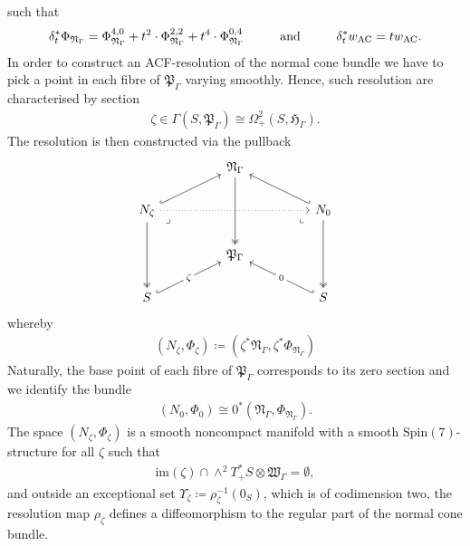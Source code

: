 \documentclass[psamsfonts]{amsart}
\theoremstyle{plain}
\theoremstyle{definition}{
\newtheorem{defi}{Definition}[section]
\newtheorem{ass}{Assumption}
\newtheorem*{nota}{Notation}}
\theoremstyle{remark}{
\newtheorem{rem}{Remark}
\newtheorem{ex}{Example}}
\theoremstyle{plain}{
\newtheorem{thm}{Theorem}[section]
\newtheorem{lem}{Lemma}[section]
\newtheorem{cor}{Corollary}[section]
\newtheorem{prop}{Proposition}[section]
\newtheorem{con}{Conjecture}[section]}
\newcommand{\m}[1]{{\mathrm{#1}}}
\newcommand{\und}[1]{\hspace{#1}\text{and}\hspace{#1}}
\begin{document}
   such that 
   \begin{align*}
       \delta_t^*\Phi_{\mathfrak{N}_\Gamma}=\Phi_{\mathfrak{N}_\Gamma}^{4,0}+t^2\cdot\Phi_{\mathfrak{N}_\Gamma}^{2,2}+t^4\cdot\Phi_{\mathfrak{N}_\Gamma}^{0,4}\und{1.0cm}\delta_t^*w_{\m{AC}}=tw_{\m{AC}}.
   \end{align*}
In order to construct an ACF-resolution of the normal cone bundle we have to pick a point in each fibre of $\mathfrak{P}_\Gamma$ varying smoothly. Hence, such resolution are characterised by section 
\begin{align*}
    \zeta\in \Gamma(S,\mathfrak{P}_\Gamma)\cong \Omega^2_+(S,\mathfrak{H}_\Gamma).
\end{align*}
The resolution is then constructed via the pullback
\begin{equation*}
    \begin{tikzcd}
	&& {\mathfrak{N}_\Gamma} && \\
	{N_\zeta} &&&& {N_0} \\
	&& {\mathfrak{P}_\Gamma} \\
	S &&&& S
	\arrow[two heads, from=1-3, to=3-3]
	\arrow[hook, from=2-1, to=1-3]
	\arrow[dotted, from=2-1, to=2-5]
	\arrow["\lrcorner"{anchor=center, pos=0.125}, draw=none, from=2-1, to=3-3]
	\arrow[two heads, from=2-1, to=4-1]
	\arrow[hook', from=2-5, to=1-3]
	\arrow["\lrcorner"{anchor=center, pos=0.125, rotate=-90}, draw=none, from=2-5, to=3-3]
	\arrow[two heads, from=2-5, to=4-5]
	\arrow["\zeta"{description}, hook, from=4-1, to=3-3]
	\arrow["0"{description}, hook', from=4-5, to=3-3]
\end{tikzcd}
\end{equation*}
whereby 
    \begin{align*}
        (N_\zeta,\Phi_\zeta)\coloneqq (\zeta^*\mathfrak{N}_\Gamma,\zeta^*\Phi_{\mathfrak{N}_\Gamma})
    \end{align*}
Naturally, the base point of each fibre of $\mathfrak{P}_\Gamma$ corresponds to its zero section and we identify the bundle
\begin{align*}
    (N_0,\Phi_0)\cong 0^*(\mathfrak{N}_\Gamma,\Phi_{\mathfrak{N}_\Gamma}).
\end{align*}
The space $(N_\zeta,\Phi_\zeta)$ is a smooth noncompact manifold with a smooth $\m{Spin}(7)$-structure for all $\zeta$ such that 
\begin{align*}
    \m{im}(\zeta)\cap \wedge^2T^*_+S\otimes \mathfrak{W}_\Gamma=\emptyset,
\end{align*}
and outside an exceptional set $\Upsilon_\zeta\coloneqq \rho_\zeta^{-1}(0_S)$, which is of codimension two, the resolution map $\rho_\zeta$ defines a diffeomorphism to the regular part of the normal cone bundle.\\
\end{document}
